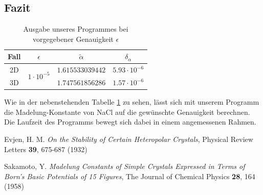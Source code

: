 \documentclass[10pt,a4paper]{article}
\begin{document}
\subsection{Fazit}
\begin{table}
\vspace{-15pt}
\begin{tabular}{c|c|c|c}
Fall & $\epsilon$                       & $\tilde{\alpha}$ & $\delta_\alpha$    \\ \hline
2D   & \multirow{2}{*}{$1\cdot10^{-5}$} & $1.615533039442$ & $5.93\cdot10^{-6}$ \\ \cline{1-1} \cline{3-4} 
3D   &                                  & $1.747561856286$ & $1.57\cdot10^{-6}$ \\
\end{tabular}
\caption{Ausgabe unseres Programmes bei vorgegebener Genauigkeit $\epsilon$}
\label{tab:ausgabe}
\end{table}
Wie in der nebenstehenden Tabelle \ref{tab:ausgabe} zu sehen, lässt sich mit unserem Programm die Madelung-Konstante von NaCl auf die gewünschte Genauigkeit berechnen. Die Laufzeit des Programms bewegt sich dabei in einem angemessenen Rahmen.

\begin{thebibliography}{9}

Evjen, H. M.
\emph{On the Stability of Certain Heteropolar Crystals},
Physical Review Letters \textbf{39},
675-687 (1932)

Sakamoto, Y.
\emph{Madelung Constants of Simple Crystals Expressed in Terms of Born's Basic
Potentials of 15 Figures},
The Journal of Chemical Physics \textbf{28},
164 (1958)

\end{thebibliography}
\end{document}
